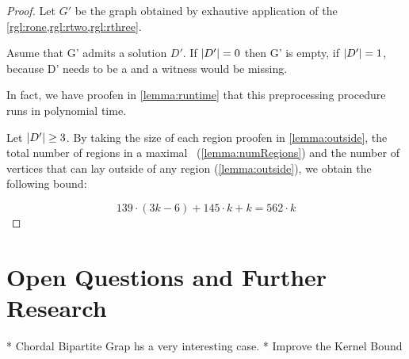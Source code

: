 \centraltheo*

\begin{proof}
    Let $G'$ be the graph obtained by exhautive application of the \cref{rgl:rone,rgl:rtwo,rgl:rthree}. 
    
    Asume that G' admits a solution $D'$. If  $\abs{D'} = 0$ then G' is empty, if $\abs{D'} = 1$, because D' needs to be a \sdom and a witness would be missing.
    
    In fact, we have proofen in \cref{lemma:runtime} that this preprocessing procedure runs in polynomial time.
    
    Let $\abs{D'} \geq 3$. By taking the size of each region proofen in \cref{lemma:outside}, the total number of regions in a maximal \dreg~(\cref{lemma:numRegions}) and the number of vertices that can lay outside of any region (\cref{lemma:outside}), we obtain the following bound:
    
\begin{equation}
    139 \cdot (3k - 6) + 145 \cdot k + k = 562 \cdot k
\end{equation}

\end{proof}

\chapter{Open Questions and Further Research}

* Chordal Bipartite Grap hs a very interesting case.
* Improve the Kernel Bound